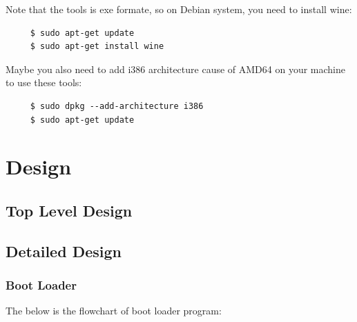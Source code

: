 \documentclass{swfcthesis}
\begin{document}
Note that the tools is exe formate, so on Debian system, you need to install wine:
\begin{lstlisting}
     $ sudo apt-get update
     $ sudo apt-get install wine
\end{lstlisting}

Maybe you also need to add i386 architecture cause of AMD64 on your machine to use \hspace*{0.8cm}these tools:
\begin{lstlisting}
     $ sudo dpkg --add-architecture i386
     $ sudo apt-get update
\end{lstlisting}

\chapter{Design}

\section{Top Level Design}
\label{sec:top-level-design}

\section{Detailed Design}
\label{sec:detailed-design}

\subsection{Boot Loader}
\label{sec:boot-loader}


The below is the flowchart of boot loader program:
\end{document}
